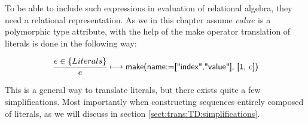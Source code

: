 To be able to include such expressions in evaluation of relational algebra, they need a relational representation.
As we in this chapter assume $value$ is a polymorphic type attribute, with the help of the \textsf{make} operator
translation of literals is done in the following way:

\begin{equation}
\frac{e \in \left\{Literals\right\}}{e}\longmapsto
\mbox{\textsf{make(name:=["index","value"], [1, }}e\mbox{\textsf{])}}
\label{rule:trans:TD:literal}
\end{equation}

This is a general way to translate literals, but there exists quite a few simplifications. Most importantly when
constructing sequences entirely composed of literals, as we will discuss in section
\ref{sect:trans:TD:simplifications}.

